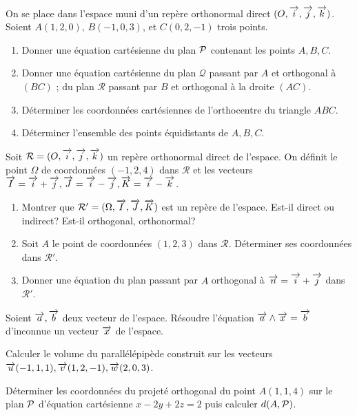 \begin{exercice}
    On se place dans l'espace muni d'un repère orthonormal direct \((O, \vi, \vj, \vk)\). Soient \(A(1,2,0)\), \(B(-1,0,3)\), et \(C(0,2,-1)\) trois points.
    \begin{enumerate}
        \item Donner une équation cartésienne du plan \(\P\) contenant les points \(A, B, C\).
        \item Donner une équation cartésienne du plan \(\mathcal{Q}\) passant par \(A\) et orthogonal à \((BC)\) ; du plan \(\mathcal{R}\) passant par \(B\) et orthogonal à la droite \((AC)\).
        \item Déterminer les coordonnées cartésiennes de l'orthocentre du triangle \(ABC\).
        \item Déterminer l'ensemble des points équidistants de \(A, B, C\).
    \end{enumerate}
\end{exercice}
\begin{exercice}
    Soit \(\mathcal{R} = (O, \vi, \vj, \vk)\) un repère orthonormal direct de l'espace. On définit le point \(\Omega\) de coordonnées \((-1,2,4)\) dans \(\mathcal{R}\) et les vecteurs \(\vect{I} = \vi+\vj, \vect{J} = \vi - \vj, \vect{K} = \vi - \vk\).
    \begin{enumerate}
        \item Montrer que \(\mathcal{R}' = (\Omega, \vect{I}, \vect{J}, \vect{K})\) est un repère de l'espace. Est-il direct ou indirect? Est-il orthogonal, orthonormal?
        \item Soit \(A\) le point de coordonnées \((1, 2, 3)\) dans \(\mathcal{R}\). Déterminer ses coordonnées dans \(\mathcal{R}'\).
        \item Donner une équation du plan passant par \(A\) orthogonal à \(\vn = \vi + \vj\) dans \(\mathcal{R}'\).
    \end{enumerate}
\end{exercice}
\begin{exercice}
    Soient \(\va, \vb\) deux vecteur de l'espace. Résoudre l'équation \(\va \wedge \vect{x} = \vb\) d'inconnue un vecteur \(\vect{x}\) de l'espace.
\end{exercice}
\begin{exercice}
    Calculer le volume du parallélépipède construit sur les vecteurs \(\vu(-1,1,1), \vv(1,2,-1), \vw(2,0,3)\).
\end{exercice}
\begin{exercice}
    Déterminer les coordonnées du projeté orthogonal du point \(A(1,1,4)\) sur le plan \(\P\) d'équation cartésienne \(x-2y+2z = 2\) puis calculer \(d(A,\P)\).
\end{exercice}
